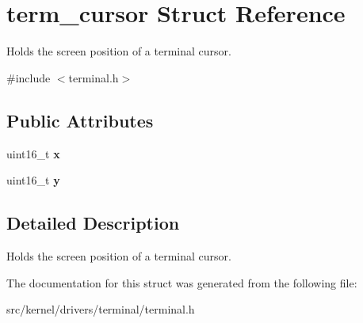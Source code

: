 \hypertarget{structterm__cursor}{}\section{term\+\_\+cursor Struct Reference}
\label{structterm__cursor}


Holds the screen position of a terminal cursor.  




{\ttfamily \#include $<$terminal.\+h$>$}

\subsection*{Public Attributes}
\begin{DoxyCompactItemize}
\item 
\mbox{\label{structterm__cursor_abf80620dad99f8c76b7b054a4211f5f2}} 
uint16\+\_\+t {\bfseries x}
\item 
\mbox{\label{structterm__cursor_a6895afcb0e345b72a707b15119937db5}} 
uint16\+\_\+t {\bfseries y}
\end{DoxyCompactItemize}


\subsection{Detailed Description}
Holds the screen position of a terminal cursor. 

The documentation for this struct was generated from the following file\+:\begin{DoxyCompactItemize}
\item 
src/kernel/drivers/terminal/terminal.\+h\end{DoxyCompactItemize}
